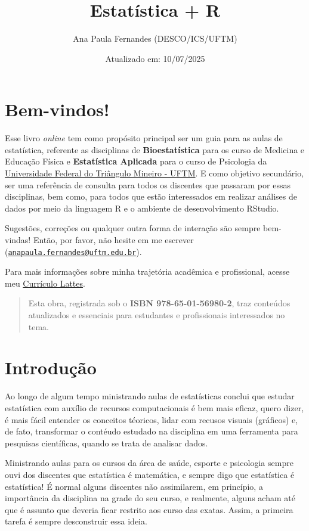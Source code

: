 \documentclass[
]{book}
\title{Estatística + R}
\author{Ana Paula Fernandes (DESCO/ICS/UFTM)}
\date{Atualizado em: 10/07/2025}
\begin{document}
\maketitle

{
\setcounter{tocdepth}{1}
\tableofcontents
}
\chapter{Bem-vindos!}\label{bem-vindos}

Esse livro \emph{online} tem como propósito principal ser um guia para as aulas de estatística, referente as disciplinas de \textbf{Bioestatística} para os curso de Medicina e Educação Física e \textbf{Estatística Aplicada} para o curso de Psicologia da \href{http://www.uftm.edu.br}{Universidade Federal do Triângulo Mineiro - UFTM}. E como objetivo secundário, ser uma referência de consulta para todos os discentes que passaram por essas disciplinas, bem como, para todos que estão interessados em realizar análises de dados por meio da linguagem R e o ambiente de desenvolvimento RStudio.

Sugestões, correções ou qualquer outra forma de interação são sempre bem-vindas! Então, por favor, não hesite em me escrever (\href{mailto:anapaula.fernandes@uftm.edu.br}{\nolinkurl{anapaula.fernandes@uftm.edu.br}}).

Para mais informações sobre minha trajetória acadêmica e profissional, acesse meu \href{https://lattes.cnpq.br/5582801060910261}{Currículo Lattes}.

\begin{quote}
Esta obra, registrada sob o \textbf{ISBN 978-65-01-56980-2}, traz conteúdos atualizados e essenciais para estudantes e profissionais interessados no tema.
\end{quote}

\chapter{Introdução}\label{intro}

Ao longo de algum tempo ministrando aulas de estatísticas conclui que estudar estatística com auxílio de recursos computacionais é bem mais eficaz, quero dizer, é mais fácil entender os conceitos téoricos, lidar com recusos visuais (gráficos) e, de fato, transformar o contéudo estudado na disciplina em uma ferramenta para pesquisas científicas, quando se trata de analisar dados.

Ministrando aulas para os cursos da área de saúde, esporte e psicologia sempre ouvi dos discentes que estatística é matemática, e sempre digo que estatística é estatística! É normal alguns discentes não assimilarem, em princípio, a importância da disciplina na grade do seu curso, e realmente, alguns acham até que é assunto que deveria ficar restrito aos curso das exatas. Assim, a primeira tarefa é sempre desconstruir essa ideia.
\end{document}
